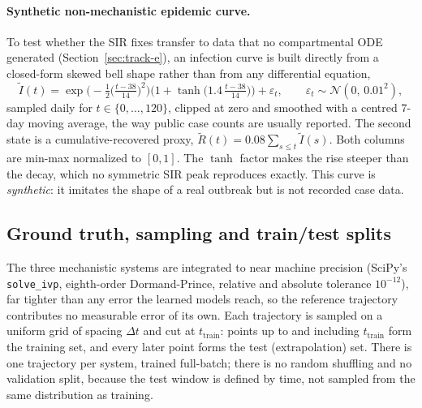 \paragraph{Synthetic non-mechanistic epidemic curve.} To test whether the SIR
fixes transfer to data that no compartmental ODE generated
(Section~\ref{sec:track-e}), an infection curve is built directly from a
closed-form skewed bell shape rather than from any differential equation,
\begin{equation}
\tilde I(t)=\exp\!\Big(-\tfrac12\big(\tfrac{t-38}{14}\big)^2\Big)\Big(1+\tanh\big(1.4\,\tfrac{t-38}{14}\big)\Big)+\varepsilon_t,
\qquad \varepsilon_t\sim\mathcal N(0,\,0.01^2),
\label{eq:synthetic-epidemic}
\end{equation}
sampled daily for $t\in\{0,\dots,120\}$, clipped at zero and smoothed with a
centred 7-day moving average, the way public case counts are usually reported. The
second state is a cumulative-recovered proxy,
$\tilde R(t)=0.08\sum_{s\le t}\tilde I(s)$. Both columns are min-max
normalized to $[0,1]$. The $\tanh$ factor makes the rise steeper than the
decay, which no symmetric SIR peak reproduces exactly. This curve is
\emph{synthetic}: it imitates the shape of a real outbreak but is not
recorded case data.

\subsection{Ground truth, sampling and train/test splits}

The three mechanistic systems are integrated to near machine precision
(SciPy's \texttt{solve\_ivp}, eighth-order Dormand-Prince, relative and
absolute tolerance $10^{-12}$), far tighter than any error the learned models
reach, so the reference trajectory contributes no measurable error of its
own. Each trajectory is sampled on a uniform grid of spacing $\Delta t$ and
cut at $t_{\text{train}}$: points up to and including $t_{\text{train}}$ form
the training set, and every later point forms the test (extrapolation) set.
There is one trajectory per system, trained full-batch; there is no random
shuffling and no validation split, because the test window is defined by
time, not sampled from the same distribution as training.

